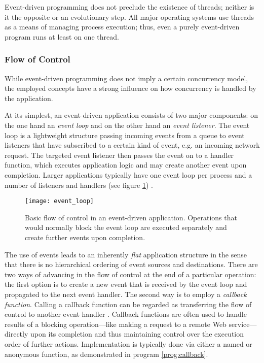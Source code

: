 Event-driven programming does not preclude the existence of threads; neither is it the opposite or an evolutionary step. All major operating systems use threads as a means of managing process execution; thus, even a purely event-driven program runs at least on one thread.

\subsubsection*{Flow of Control}
\label{lab:flow}
While event-driven programming does not imply a certain concurrency model, the employed concepts have a strong influence on how concurrency is handled by the application.

At its simplest, an event-driven application consists of two major components: on the one hand an \textit{event loop} and on the other hand an \textit{event listener}. The event loop is a lightweight structure passing incoming events from a queue to event listeners that have subscribed to a certain kind of event, e.g. an incoming network request. The targeted event listener then passes the event on to a handler function, which executes application logic and may create another event upon completion. Larger applications typically have one event loop per process and a number of listeners and handlers (see figure \ref{fig:event_loop}) \cite[p. 33]{Hughes-Croucher2012}.

\begin{figure}
\centering\small
\setlength{\tabcolsep}{0mm}
  \texttt{[image: event\_loop]}
\caption{
Basic flow of control in an event-driven application. Operations that would normally block the event loop are executed separately and create further events upon completion.
}
\label{fig:event_loop}
\end{figure}

The use of events leads to an inherently \textit{flat} application structure in the sense that there is no hierarchical ordering of event sources and destinations. There are two ways of advancing in the flow of control at the end of a particular operation: the first option is to create a new event that is received by the event loop and propagated to the next event handler. The second way is to employ a \textit{callback function}. Calling a callback function can be regarded as transferring the flow of control to another event handler \cite[p. 92]{Erb2012}. Callback functions are often used to handle results of a blocking operation---like making a request to a remote Web service---directly upon its completion and thus maintaining control over the execution order of further actions. Implementation is typically done via either a named or anonymous function, as demonstrated in program \ref{prog:callback}.

